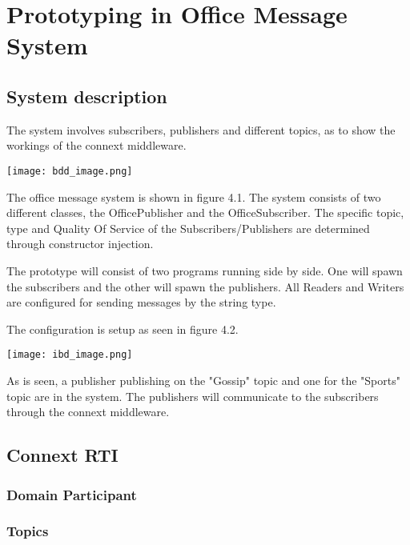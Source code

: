 \chapter{Prototyping in Office Message System}

\section{System description}
The system involves subscribers, publishers and different topics, as to show the workings of the connext middleware. 

\begin{center}
	\texttt{[image: bdd\_image.png]}
\end{center}

The office message system is shown in figure 4.1. The system consists of two different classes, the OfficePublisher and the OfficeSubscriber. The specific topic, type and Quality Of Service of the Subscribers/Publishers are determined through constructor injection.

The prototype will consist of two programs running side by side. One will spawn the subscribers and the other will spawn the publishers. All Readers and Writers are configured for sending messages by the string type. 

The configuration is setup as seen in figure 4.2.

\begin{center}
	\texttt{[image: ibd\_image.png]}
\end{center}

As is seen, a publisher publishing on the "Gossip" topic and one for the "Sports" topic are in the system. The publishers will communicate to the subscribers through the connext middleware.

\section{Connext RTI}

\subsection{Domain Participant}

\subsection{Topics}


